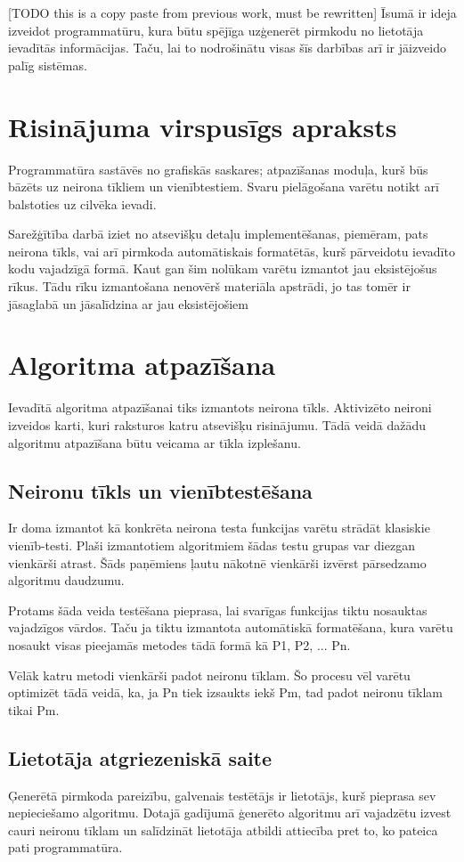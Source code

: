 [TODO this is a copy paste from previous work, must be rewritten]
Īsumā ir ideja izveidot programmatūru, kura būtu spējīga uzģenerēt pirmkodu no lietotāja ievadītās informācijas. Taču, lai to nodrošinātu visas šīs darbības arī ir jāizveido palīg sistēmas. 

\section{Risinājuma virspusīgs apraksts}
Programmatūra sastāvēs no grafiskās saskares; atpazīšanas moduļa, kurš būs bāzēts uz neirona tīkliem un vienībtestiem. Svaru pielāgošana varētu notikt arī balstoties uz cilvēka ievadi.

Sarežģītība darbā iziet no atsevišķu detaļu implementēšanas, piemēram, pats neirona tīkls, vai arī pirmkoda automātiskais formatētās, kurš pārveidotu ievadīto kodu vajadzīgā formā. Kaut gan šim nolūkam varētu izmantot jau eksistējošus rīkus. Tādu rīku izmantošana nenovērš materiāla apstrādi, jo tas tomēr ir jāsaglabā un jāsalīdzina ar jau eksistējošiem

\section{Algoritma atpazīšana}
Ievadītā algoritma atpazīšanai tiks izmantots neirona tīkls. Aktivizēto neironi izveidos karti, kuri raksturos katru atsevišķu risinājumu. Tādā veidā dažādu algoritmu atpazīšana būtu veicama ar tīkla izplešanu.

\subsection{Neironu tīkls un vienībtestēšana}
Ir doma izmantot kā konkrēta neirona testa funkcijas varētu strādāt klasiskie vienīb-testi. Plaši izmantotiem algoritmiem šādas testu grupas var diezgan vienkārši atrast. Šāds paņēmiens ļautu nākotnē vienkārši izvērst pārsedzamo algoritmu daudzumu.

Protams šāda veida testēšana pieprasa, lai svarīgas funkcijas tiktu nosauktas vajadzīgos vārdos. Taču ja tiktu izmantota automātiskā formatēšana, kura varētu nosaukt visas pieejamās metodes tādā formā kā P1, P2, ... Pn.

Vēlāk katru metodi vienkārši padot neironu tīklam. Šo procesu vēl varētu optimizēt tādā veidā, ka, ja Pn tiek izsaukts iekš Pm, tad padot neironu tīklam tikai Pm.

\subsection{Lietotāja atgriezeniskā saite}
Ģenerētā pirmkoda pareizību, galvenais testētājs ir lietotājs, kurš pieprasa sev nepieciešamo algoritmu. Dotajā gadījumā ģenerēto algoritmu arī vajadzētu izvest cauri neironu tīklam un salīdzināt lietotāja atbildi attiecība pret to, ko pateica pati programmatūra.

